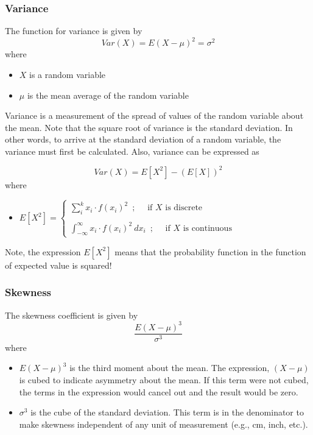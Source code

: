 \documentclass{article}
\begin{document}
\newpage
\subsubsection{Variance}

The function for variance is given by
$$ Var(X) = E(X-\mu)^2 = \sigma^2 $$
where 
\begin{itemize}
    \item $X$ is a random variable
    \item $\mu$ is the mean average of the random variable
\end{itemize}
\hfill \break
Variance is a measurement of the spread of values of the random variable about the mean. Note that the square root of variance is the standard deviation. In other words, to arrive at the standard deviation of a random variable, the variance must first be calculated. Also, variance can be expressed as

$$ Var(X) = E[X^2] - (E[X])^2  $$
where
\begin{itemize}
    \item $E[X^2] = \begin{cases} \sum_{i}^{k} x_i \cdot f(x_i)^2 \enspace ; \quad \text{ if } X \text{ is discrete} \\ \\ \int_{-\infty}^{\infty} x_i \cdot f(x_i)^2 \: dx_i \enspace ; \quad \text{ if } X \text{ is continuous} \end{cases}$
\end{itemize}
\hfill \break
Note, the expression $E[X^2]$ means that the probability function in the function of expected value is squared!

\subsubsection{Skewness}
The skewness coefficient is given by
$$ \frac{E(X-\mu)^3}{\sigma^3} $$
where
\begin{itemize}
    \item $E(X-\mu)^3$ is the third moment about the mean. The expression, $(X-\mu)$ is cubed to indicate asymmetry about the mean. If this term were not cubed, the terms in the expression would cancel out and the result would be zero.
    \item $\sigma^3$ is the cube of the standard deviation. This term is in the denominator to make skewness independent of any unit of measurement (e.g., cm, inch, etc.).
\end{itemize}
\end{document}

